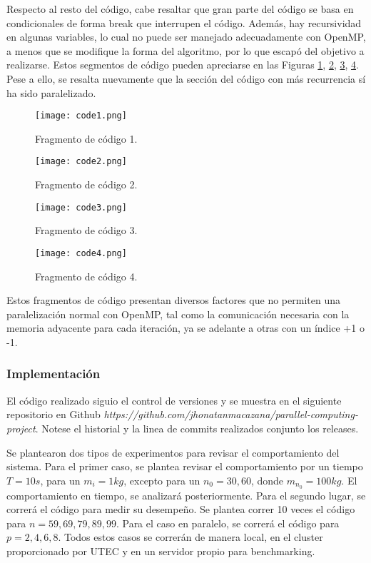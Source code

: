Respecto al resto del código, cabe resaltar que gran parte del código se basa en condicionales de forma break que interrupen el código. Además, hay recursividad en algunas variables, lo cual no puede ser manejado adecuadamente con OpenMP, a menos que se modifique la forma del algoritmo, por lo que escapó del objetivo a realizarse. Estos segmentos de código pueden apreciarse en las Figuras \ref{fig:code1}, \ref{fig:code2}, \ref{fig:code3}, \ref{fig:code4}. Pese a ello, se resalta nuevamente que la sección del código con más recurrencia sí ha sido paralelizado.


\begin{figure}
	\centering
	\texttt{[image: code1.png]}
	\caption{Fragmento de código 1.}
	\label{fig:code1}
\end{figure}

\begin{figure}
	\centering
	\texttt{[image: code2.png]}
	\caption{Fragmento de código 2.}
	\label{fig:code2}
\end{figure}


\begin{figure}
	\centering
	\texttt{[image: code3.png]}
	\caption{Fragmento de código 3.}
	\label{fig:code3}
\end{figure}

\begin{figure}
	\centering
	\texttt{[image: code4.png]}
	\caption{Fragmento de código 4.}
	\label{fig:code4}
\end{figure}

Estos fragmentos de código presentan diversos factores que no permiten una paralelización normal con OpenMP, tal como la comunicación necesaria con la memoria adyacente para cada iteración, ya se adelante a otras con un índice +1 o -1.

\subsubsection{Implementación}
El código realizado siguio el control de versiones  y se muestra en el siguiente repositorio en Github \textit{https://github.com/jhonatanmacazana/parallel-computing-project}. Notese el historial y la linea de commits realizados conjunto los releases.

Se plantearon dos tipos de experimentos para revisar el comportamiento del sistema. Para el primer caso, se plantea revisar el comportamiento por un tiempo $T = 10s$, para un $m_i = 1 kg$, excepto para un $n_0 = 30, 60$, donde $m_{n_0} = 100 kg$. El comportamiento en tiempo, se analizará posteriormente. Para el segundo lugar, se correrá el código para medir su desempeño. Se plantea correr 10 veces el código para $n={59,69,79,89,99}$. Para el caso en paralelo, se correrá el código para $p={2,4,6,8}$. Todos estos casos se correrán de manera local, en el cluster proporcionado por UTEC y en un servidor propio para benchmarking.

